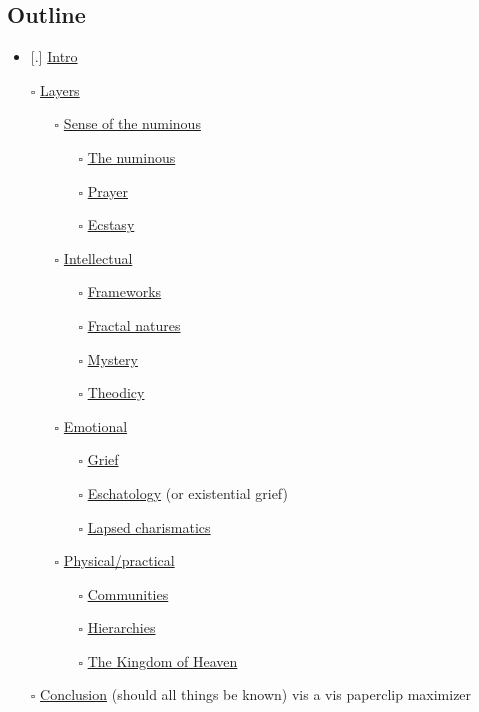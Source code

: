 \hypertarget{outline}{%
\subsection{Outline}\label{outline}}

\begin{itemize}
\tightlist
\item
  {[}.{]} \href{intro}{Intro}
\item[$\square$]
  \href{layers}{Layers}

  \begin{itemize}
  \tightlist
  \item[$\square$]
    \href{section-numinous}{Sense of the numinous}

    \begin{itemize}
    \tightlist
    \item[$\square$]
      \href{numinous}{The numinous}
    \item[$\square$]
      \href{prayer}{Prayer}
    \item[$\square$]
      \href{ecstasy}{Ecstasy}
    \end{itemize}
  \item[$\square$]
    \href{section-intellectual}{Intellectual}

    \begin{itemize}
    \tightlist
    \item[$\square$]
      \href{frameworks}{Frameworks}
    \item[$\square$]
      \href{fractal}{Fractal natures}
    \item[$\square$]
      \href{mystery}{Mystery}
    \item[$\square$]
      \href{theodicy}{Theodicy}
    \end{itemize}
  \item[$\square$]
    \href{section-emotional}{Emotional}

    \begin{itemize}
    \tightlist
    \item[$\square$]
      \href{grief}{Grief}
    \item[$\square$]
      \href{eschatology}{Eschatology} (or existential grief)
    \item[$\square$]
      \href{charismatics}{Lapsed charismatics}
    \end{itemize}
  \item[$\square$]
    \href{section-practical}{Physical/practical}

    \begin{itemize}
    \tightlist
    \item[$\square$]
      \href{communities}{Communities}
    \item[$\square$]
      \href{hierarchies}{Hierarchies}
    \item[$\square$]
      \href{kingdom}{The Kingdom of Heaven}
    \end{itemize}
  \end{itemize}
\item[$\square$]
  \href{conclusion}{Conclusion} (should all things be known) vis a vis paperclip maximizer
\end{itemize}

